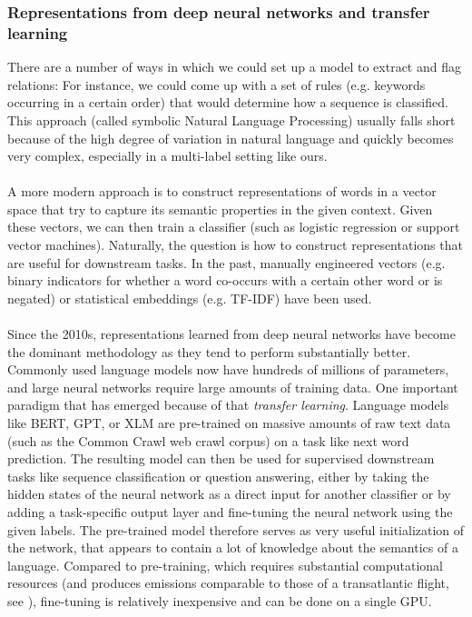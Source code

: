 \subsubsection{Representations from deep neural networks and transfer learning}
There are a number of ways in which we could set up a model to extract and flag relations: For instance, we could come up with a set of rules (e.g. keywords occurring in a certain order) that would determine how a sequence is classified. This approach (called symbolic Natural Language Processing) usually falls short because of the high degree of variation in natural language and quickly becomes very complex, especially in a multi-label setting like ours. \\\\
A more modern approach is to construct representations of words in a vector space that try to capture its semantic properties in the given context. Given these vectors, we can then train a classifier (such as logistic regression or support vector machines). Naturally, the question is how to construct representations that are useful for downstream tasks. In the past, manually engineered vectors (e.g. binary indicators for whether a word co-occurs with a certain other word or is negated) or statistical embeddings (e.g. TF-IDF) have been used. \\\\
Since the 2010s, representations learned from deep neural networks have become the dominant methodology as they tend to perform substantially better. Commonly used language models now have hundreds of millions of parameters, and large neural networks require large amounts of training data. One important paradigm that has emerged because of that \textit{transfer learning}. Language models like BERT, GPT, or XLM are pre-trained on massive amounts of raw text data (such as the Common Crawl web crawl corpus) on a task like next word prediction. The resulting model can then be used for supervised downstream tasks like sequence classification or question answering, either by taking the hidden states of the neural network as a direct input for another classifier or by adding a task-specific output layer and fine-tuning the neural network using the given labels. The pre-trained model therefore serves as very useful initialization of the network, that appears to contain a lot of knowledge about the semantics of a language. Compared to pre-training, which requires substantial computational resources (and produces emissions comparable to those of a transatlantic flight, see \citet{strubell2019energy}), fine-tuning is relatively inexpensive and can be done on a single GPU.

